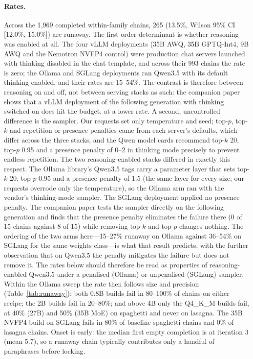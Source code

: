 \documentclass[11pt]{article}
\begin{document}
\paragraph{Rates.}
Across the 1{,}969 completed within-family chains, 265 (13.5\%, Wilson 95\%
CI [12.0\%, 15.0\%]) are runaway. The first-order determinant is whether
reasoning was enabled at all. The four vLLM deployments (35B AWQ, 35B
GPTQ-Int4, 9B AWQ and the Nemotron NVFP4 control) were production chat
servers launched with thinking disabled in the chat template, and across
their 993 chains the rate is zero; the Ollama and SGLang deployments ran
Qwen3.5 with its default thinking enabled, and their rates are 15--54\%. The
contrast is therefore between reasoning on and off, not between serving
stacks as such: the companion paper~\citep{smith2026generations} shows that a vLLM
deployment of the following generation with thinking switched on does hit
the budget, at a
lower rate. A second, uncontrolled difference is the sampler. Our requests
set only temperature and seed; top-$p$, top-$k$ and repetition or presence
penalties came from each server's defaults, which differ across the three
stacks, and the Qwen model cards recommend top-$k$ 20, top-$p$ 0.95 and a
presence penalty of 0--2 in thinking mode precisely to prevent endless
repetition. The two reasoning-enabled stacks differed in exactly this respect. The
Ollama library's Qwen3.5 tags carry a parameter layer that sets
top-$k$ 20, top-$p$ 0.95 and a presence penalty of 1.5 (the same layer for
every size; our requests overrode only the temperature), so the Ollama arm
ran with the vendor's thinking-mode sampler. The SGLang deployment applied
no presence penalty. The companion paper tests the sampler directly on the
following generation and finds that the presence penalty eliminates the
failure there (0 of 15 chains against 8 of 15) while removing top-$k$ and
top-$p$ changes nothing. The ordering of the two arms here---15--27\%
runaway on Ollama against 36--54\% on SGLang for the same weights
class---is what that result predicts, with the further observation that on
Qwen3.5 the penalty mitigates the failure but does not remove it. The rates
below should therefore be read as properties of reasoning-enabled Qwen3.5
under a penalised (Ollama) or unpenalised (SGLang) sampler. Within the Ollama sweep the rate
then follows size and precision (Table~\ref{tab:runaway}): both 0.8B builds fail
in 80--100\% of chains on either recipe; the 2B builds fail in 20--80\%; and
above 4B only the Q4\_K\_M builds fail, at 40\% (27B) and 50\% (35B MoE) on
spaghetti and never on lasagna. The 35B NVFP4 build on SGLang fails in 80\%
of baseline spaghetti chains and 0\% of lasagna chains. Onset is early: the
median first empty completion is at iteration 3 (mean 5.7), so a runaway
chain typically contributes only a handful of paraphrases before locking.
\end{document}
